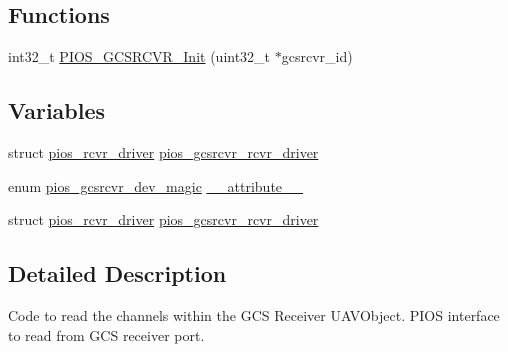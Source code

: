 \subsection*{\-Functions}
\begin{DoxyCompactItemize}
\item 
int32\-\_\-t \hyperlink{group___p_i_o_s___g_c_s_r_c_v_r_ga58dd7d9c9bc500b52d54bc7bb5e9fd01}{\-P\-I\-O\-S\-\_\-\-G\-C\-S\-R\-C\-V\-R\-\_\-\-Init} (uint32\-\_\-t $\ast$gcsrcvr\-\_\-id)
\end{DoxyCompactItemize}
\subsection*{\-Variables}
\begin{DoxyCompactItemize}
\item 
struct \hyperlink{structpios__rcvr__driver}{pios\-\_\-rcvr\-\_\-driver} \hyperlink{group___p_i_o_s___g_c_s_r_c_v_r_ga6405e16bd59aa95205a0d825e3f0b31d}{pios\-\_\-gcsrcvr\-\_\-rcvr\-\_\-driver}
\item 
enum \hyperlink{group___p_i_o_s___g_c_s_r_c_v_r_ga88de96a8f2cf14a06395b79f0996c923}{pios\-\_\-gcsrcvr\-\_\-dev\-\_\-magic} \hyperlink{group___p_i_o_s___g_c_s_r_c_v_r_gac9a40b3462b5b1cedc9c9525b2c1f278}{\-\_\-\-\_\-attribute\-\_\-\-\_\-}
\item 
struct \hyperlink{structpios__rcvr__driver}{pios\-\_\-rcvr\-\_\-driver} \hyperlink{group___p_i_o_s___g_c_s_r_c_v_r_ga6405e16bd59aa95205a0d825e3f0b31d}{pios\-\_\-gcsrcvr\-\_\-rcvr\-\_\-driver}
\end{DoxyCompactItemize}


\subsection{\-Detailed \-Description}
\-Code to read the channels within the \-G\-C\-S \-Receiver \-U\-A\-V\-Object. \-P\-I\-O\-S interface to read from \-G\-C\-S receiver port. 

